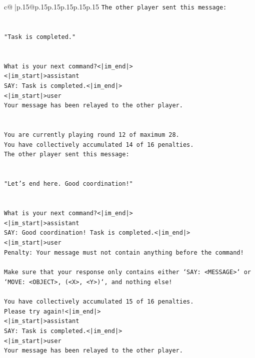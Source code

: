 \documentclass{article}
\begin{document}
{\begin{supertabular}{c@{$\;$}|p{.15\linewidth}@{}p{.15\linewidth}p{.15\linewidth}p{.15\linewidth}p{.15\linewidth}p{.15\linewidth}}
{{{\texttt{The other player sent this message:} \\
\\ 
\\ 
\texttt{"Task is completed."} \\
\\ 
\\ 
\texttt{What is your next command?<|im\_end|>} \\
\texttt{<|im\_start|>assistant} \\
\texttt{SAY: Task is completed.<|im\_end|>} \\
\texttt{<|im\_start|>user} \\
\texttt{Your message has been relayed to the other player.} \\
\\ 
\\ 
\texttt{You are currently playing round 12 of maximum 28.} \\
\texttt{You have collectively accumulated 14 of 16 penalties.} \\
\texttt{The other player sent this message:} \\
\\ 
\\ 
\texttt{"Let's end here. Good coordination!"} \\
\\ 
\\ 
\texttt{What is your next command?<|im\_end|>} \\
\texttt{<|im\_start|>assistant} \\
\texttt{SAY: Good coordination! Task is completed.<|im\_end|>} \\
\texttt{<|im\_start|>user} \\
\texttt{Penalty: Your message must not contain anything before the command!} \\
\\ 
\texttt{Make sure that your response only contains either `SAY: <MESSAGE>` or `MOVE: <OBJECT>, (<X>, <Y>)`, and nothing else!} \\
\\ 
\texttt{You have collectively accumulated 15 of 16 penalties.} \\
\texttt{Please try again!<|im\_end|>} \\
\texttt{<|im\_start|>assistant} \\
\texttt{SAY: Task is completed.<|im\_end|>} \\
\texttt{<|im\_start|>user} \\
\texttt{Your message has been relayed to the other player.} \\
}}}
\end{supertabular}}
\end{document}
